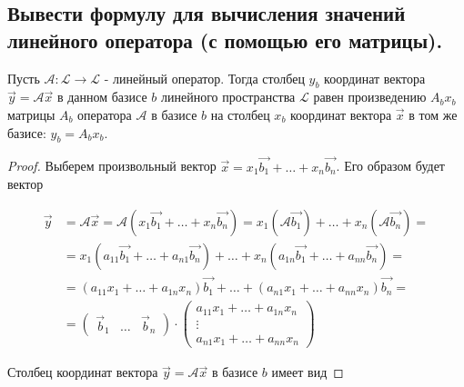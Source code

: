 \subsection{
    Вывести формулу для вычисления значений линейного оператора (с помощью его матрицы).
}

\begin{theorem}
    Пусть $\mathscr{A} \colon \mathcal{L} \to \mathcal{L}$ - линейный оператор. Тогда столбец $y_b$ координат вектора $\vec{y} = \mathscr{A}\vec{x}$ в данном базисе $b$ линейного пространства $\mathcal{L}$ равен произведению $A_bx_b$ матрицы $A_b$ оператора $\mathscr{A}$ в базисе $b$ на столбец $x_b$ координат вектора $\vec{x}$ в том же базисе: $y_b = A_bx_b$.
    \label{thm:theorem_21_1}
\end{theorem}

\begin{proof}
    Выберем произвольный вектор $\vec{x} = x_1\vec{b_1} + \ldots + x_n\vec{b_n}$. Его образом будет вектор

    \begin{align*}
        \vec{y} &= \mathscr{A}\vec{x} =  \mathscr{A}(x_1\vec{b_1} + \ldots + x_n\vec{b_n}) = x_1(\mathscr{A}\vec{b_1}) + \ldots + x_n(\mathscr{A}\vec{b_n}) = \\
        &= x_1(a_{11}\vec{b_1} + \ldots + a_{n1}\vec{b_n}) + \ldots + x_n(a_{1n}\vec{b_1} + \ldots + a_{nn}\vec{b_n}) = \\
        &= (a_{11}x_1 + \ldots + a_{1n}x_n)\vec{b_1} + \ldots + (a_{n1}x_1 + \ldots + a_{nn}x_n)\vec{b_n} = \\
        &= \begin{pmatrix}
            \vec{b}_1 & \ldots & \vec{b}_n
        \end{pmatrix} \cdot \begin{pmatrix} 
            a_{11}x_1 + \ldots + a_{1n}x_n \\
            \vdots \\
            a_{n1}x_1 + \ldots + a_{nn}x_n
        \end{pmatrix}
    \end{align*}

    Столбец координат вектора $\vec{y} = \mathscr{A}\vec{x}$ в базисе $b$ имеет вид


\end{proof}
